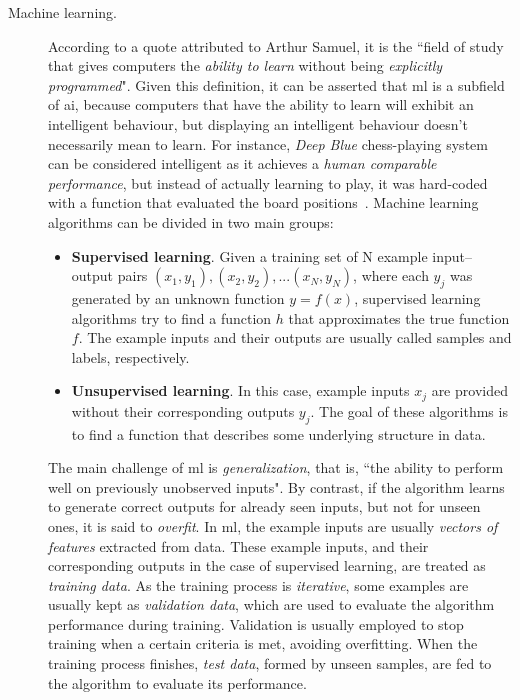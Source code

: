 \begin{description}
	\item[Machine learning.] According to a quote attributed to Arthur Samuel, it is the ``field of study that gives computers the \emph{ability to learn} without being \emph{explicitly programmed}"\cite{ml-def}. Given this definition, it can be asserted that \gls{ml} is a subfield of \gls{ai}, because computers that have the ability to learn will exhibit an intelligent behaviour, but displaying an intelligent behaviour doesn't necessarily mean to learn. For instance, \emph{Deep Blue} chess-playing system can be considered intelligent as it achieves a \emph{human comparable performance}, but instead of actually learning to play, it was hard-coded with a function that evaluated the board positions~\cite{Goodfellow-et-al-2016}. Machine learning algorithms can be divided in two main groups:
	\begin{itemize}
		\item \textbf{Supervised learning}. Given a training set of N example input–output pairs $(x_1, y_1),(x_2, y_2), . . .(x_N, y_N)$, where each $y_j$ was generated by an unknown function $y = f(x)$, supervised learning algorithms try to find a function $h$ that approximates the true function $f$\cite{Russell:2003:AIM:773294}. The example inputs and their outputs are usually called samples and labels, respectively.
		\item \textbf{Unsupervised learning}. In this case, example inputs $x_j$ are provided without their corresponding outputs $y_j$. The goal of these algorithms is to find a function that describes some underlying structure in data\cite{unsup}. 
	\end{itemize}
	The main challenge of \gls{ml} is \emph{generalization}, that is, ``the ability to perform well on previously unobserved inputs"\cite{Goodfellow-et-al-2016}. By contrast, if the algorithm learns to generate correct outputs for already seen inputs, but not for unseen ones, it is said to \emph{overfit}. In \gls{ml}, the example inputs are usually \emph{vectors of features} extracted from data. These example inputs, and their corresponding outputs in the case of supervised learning, are treated as \emph{training data}. As the training process is \emph{iterative}, some examples are usually kept as \emph{validation data}, which are used to evaluate the algorithm performance during training. Validation is usually employed to stop training when a certain criteria is met, avoiding overfitting. When the training process finishes, \emph{test data}, formed by unseen samples, are fed to the algorithm to evaluate its performance.
\end{description}
